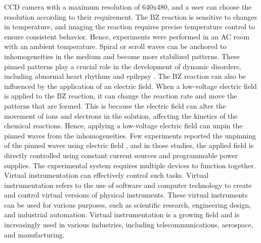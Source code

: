 \documentclass[journal=jacsat,manuscript=article]{achemso}
\begin{document}
CCD camera with a maximum resolution of 640x480, and a user can choose
the resolution according to their requirement.  The BZ reaction is
sensitive to changes in temperature, and imaging the reaction requires
precise temperature control to ensure consistent behavior. Hence,
experiments were performed in an AC room with an ambient temperature.
Spiral or scroll waves can be anchored to inhomogeneities in the
medium and become more stabilized patterns. These pinned patterns play
a crucial role in the development of dynamic disorders, including
abnormal heart rhythms \cite{bruser2012automatic}
\cite{kundu2021amplitude} and epilepsy \cite{punacha2020theory}. The
BZ reaction can also be influenced by the application of an electric
field. When a low-voltage electric field is applied to the BZ
reaction, it can change the reaction rate and move the patterns that
are formed. This is because the electric field can alter the movement
of ions and electrons in the solution, affecting the kinetics of the
chemical reactions. Hence, applying a low-voltage electric field can
unpin the pinned waves from the inhomogeneities. Few experiments
reported the unpinning of the pinned waves using electric field
\cite{steinbock1992electric}\cite{ji2013experimental}\cite{jimenez2013electric}\cite{sutthiopad2014unpinning}\cite{porjai2016electrically},
and in those studies, the applied field is directly controlled using
constant current sources and programmable power supplies. The
experimental system requires multiple devices to function together.
Virtual instrumentation can effectively control such tasks. Virtual
instrumentation refers to the use of software and computer technology
to create and control virtual versions of physical instruments. 
These virtual instruments can be used for various purposes, such as scientific research, engineering design, and industrial automation. Virtual instrumentation is a growing field and is increasingly used in various industries, including telecommunications, aerospace, and manufacturing.
\end{document}
